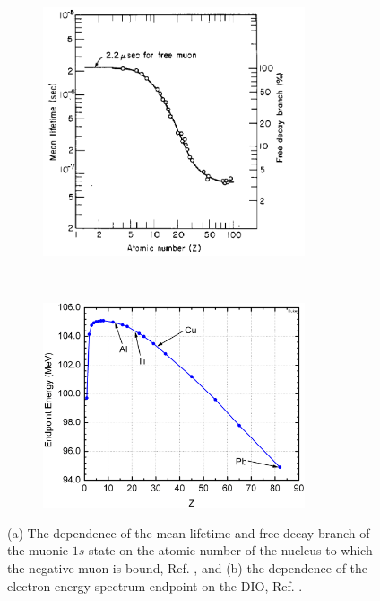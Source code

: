 \begin{figure}[!h]
    \centering
    \begin{subfigure}[t]{0.5\textwidth}
        \centering
        \includegraphics[width=0.85\textwidth]{figures/png/lifetime_mu_matter.png}
        \caption{}
        \label{fig:muonicatom}
    \end{subfigure}%
    ~ 
    \begin{subfigure}[t]{0.5\textwidth}
        \centering
        \includegraphics[width=0.85\textwidth]{figures/png/endopint.png}
        \caption{}
        \label{fig:endpoint}
    \end{subfigure}
   \caption{(a) The dependence of the mean lifetime and free decay branch
   of the muonic $1s$ state on the atomic number of the nucleus to which 
   the negative muon is bound, Ref. \cite{TYamazaki_1975}, and (b) the dependence of the electron 
   energy spectrum endpoint on the DIO, Ref. \cite{dukes}.}
    \label{fig:2imins}
  \end{figure}
